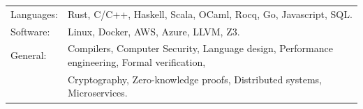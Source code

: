 \begin{tabular}{l l}
  Languages: & Rust, C/C++, Haskell, Scala, OCaml, Rocq, Go, Javascript, SQL. \\
  Software: & Linux, Docker, AWS, Azure, LLVM, Z3. \\
  General: & Compilers, Computer Security, Language design, Performance engineering, Formal verification,\\
         & Cryptography, Zero-knowledge proofs, Distributed systems, Microservices. \\
\end{tabular}


